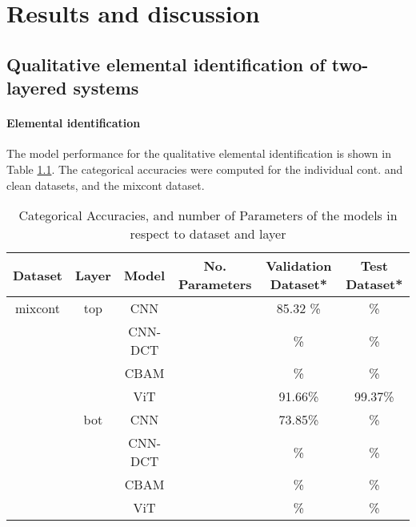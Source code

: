 

\chapter{Results and discussion} %

\label{Chapter4}



\section{Qualitative elemental identification of two-layered systems}
\subsubsection{Elemental identification}
The model performance for the qualitative elemental identification is shown in Table \ref{tab:acc_qual}. The categorical accuracies were computed for the individual cont. and clean datasets, and the mixcont dataset. 

\begin{table}[H]
    \centering
    \begin{tabular}{c|c|c|c|c|c}
        Dataset & Layer & Model   & No. Parameters & Validation Dataset*  & Test Dataset*    \\
        \hline
        mixcont & top   & CNN     &                & 85.32 \%              &        \% \\
                &       & CNN-DCT &                &       \%              &         \% \\
                &       & CBAM    &                &       \%              &         \% \\
                &       & ViT     &                &  91.66\%              &   99.37\% \\
                & bot   & CNN     &                &  73.85\%              &          \%  \\
                &       & CNN-DCT &                &       \%              &          \%  \\
                &       & CBAM    &                &       \%              &         \% \\
                &       & ViT     &                &       \%              &           \% \\
    \end{tabular}
    \caption{Categorical Accuracies, and number of Parameters of the models in respect to dataset and layer}
    \label{tab:acc_qual}
\end{table}


